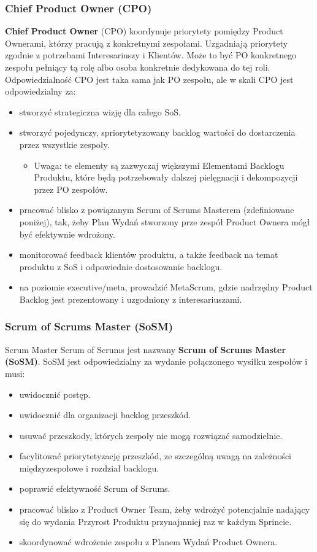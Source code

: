 \documentclass[12pt,a4paper,parskip=full]{scrartcl}
\begin{document}
\subsubsection{Chief Product Owner (CPO)}

\textbf{Chief Product Owner} (CPO) koordynuje priorytety pomiędzy Product Ownerami, którzy pracują z konkretnymi zespołami. Uzgadniają priorytety zgodnie z potrzebami Interesariuszy i Klientów. Może to być PO konkretnego zespołu pełniący tą rolę albo osoba konkretnie dedykowana do tej roli. Odpowiedzialność CPO jest taka sama jak PO zespołu, ale w skali CPO jest odpowiedzialny za:

\begin{itemize}
	\item stworzyć strategiczna wizję dla całego SoS.
	\item stworzyć pojedynczy, spriorytetyzowany backlog wartości do dostarczenia przez wszystkie zespoły.
	\begin{itemize}
		\item Uwaga: te elementy są zazwyczaj większymi Elementami Backlogu Produktu, które będą potrzebowały dalszej pielęgnacji i dekompozycji przez PO zespołów.
	\end{itemize}
	\item pracować blisko z powiązanym Scrum of Scrums Masterem (zdefiniowane poniżej), tak, żeby Plan Wydań stworzony prze zespół Product Ownera mógł być efektywnie wdrożony.
	\item monitorować feedback klientów produktu, a także feedback na temat produktu z SoS i odpowiednie dostosowanie backlogu.
	\item na poziomie executive/meta, prowadzić MetaScrum, gdzie nadrzędny Product Backlog jest prezentowany i uzgodniony z interesariuszami.
\end{itemize}



\subsubsection{Scrum of Scrums Master (SoSM)}

Scrum Master Scrum of Scrums jest nazwany \textbf{Scrum of Scrums Master (SoSM)}. SoSM jest odpowiedzialny za wydanie połączonego wysiłku zespołów i musi:

\begin{itemize}
	\item uwidocznić postęp.  %
	\item uwidocznić dla organizacji backlog przeszkód.
	\item usuwać przeszkody, których zespoły nie mogą rozwiązać samodzielnie.
	\item facylitować priorytetyzację przeszkód, ze szczególną uwagą na zależności międzyzespołowe i rozdział backlogu.
	\item poprawić efektywność Scrum of Scrums.
	\item pracować blisko z Product Owner Team, żeby wdrożyć potencjalnie nadający się do wydania Przyrost Produktu przynajmniej raz w każdym Sprincie.
	\item skoordynować wdrożenie zespołu z Planem Wydań Product Ownera.
\end{itemize}
\end{document}
